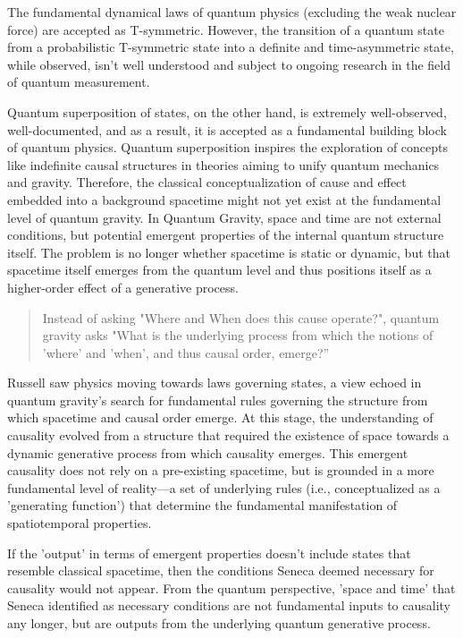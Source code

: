\documentclass{article}
\begin{document}
The fundamental dynamical laws of quantum physics (excluding the weak nuclear force) are accepted as T-symmetric. However, the transition of a quantum state from a probabilistic T-symmetric state into a definite and time-asymmetric state, while observed, isn't well understood and subject to ongoing research in the field of quantum measurement.

Quantum superposition of states, on the other hand, is extremely well-observed, well-documented, and as a result, it is accepted as a fundamental building block of quantum physics. Quantum superposition inspires the exploration of concepts like indefinite causal structures in theories aiming to unify quantum mechanics and gravity. Therefore, the classical conceptualization of cause and effect embedded into a background spacetime might not yet exist at the fundamental level of quantum gravity. In Quantum Gravity, space and time are not external conditions, but potential emergent properties of the internal quantum structure itself. The problem is no longer whether spacetime is static or dynamic, but that spacetime itself emerges from the quantum level and thus positions itself as a higher-order effect of a generative process.

\begin{quote}
    Instead of asking "Where and When does this cause operate?", quantum gravity asks "What is the underlying process from which the notions of 'where' and 'when', and thus causal order, emerge?”
\end{quote}

Russell saw physics moving towards laws governing states, a view echoed in quantum gravity's search for fundamental rules governing the structure from which spacetime and causal order emerge. At this stage, the understanding of causality evolved from a structure that required the existence of space towards a dynamic generative process from which causality emerges. This emergent causality does not rely on a pre-existing spacetime, but is grounded in a more fundamental level of reality—a set of underlying rules (i.e., conceptualized as a 'generating function') that determine the fundamental manifestation of spatiotemporal properties.

If the 'output' in terms of emergent properties doesn’t include states that resemble classical spacetime, then the conditions Seneca deemed necessary for causality would not appear. From the quantum perspective, 'space and time' that Seneca identified as necessary conditions are not fundamental inputs to causality any longer, but are outputs from the underlying quantum generative process.
\end{document}
